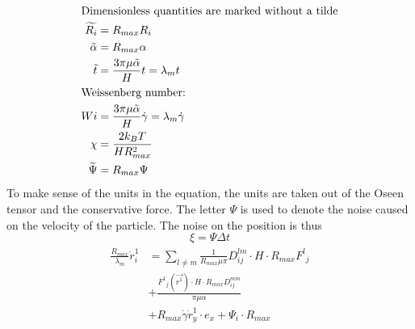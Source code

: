 \documentclass{article}
\begin{document}
\begin{align}
    \intertext{Dimensionless quantities are marked without a tilde}
    \widetilde{R_i} &= R_{max}{R_i}\\
    \tilde{\alpha }&= R_{max} {\alpha}\\
    \tilde{t} &= \frac{3\pi \mu \tilde{\alpha}}{H}{t} = \lambda_m {t} \\
    \intertext{Weissenberg number:}
    Wi &= \frac{3\pi \mu \tilde{\alpha}}{H}\dot{\gamma} =  \lambda_m \dot{\gamma}\\
    \chi &= \frac{2k_B T}{H R^2_{max}} \\
    \widetilde{\Psi} &= R_{max}{\Psi} 
\end{align}
To make sense of the units in the equation, the units are taken out of the Oseen tensor and the conservative force. The letter $\Psi$ is used to denote the noise caused on the velocity of the particle. The noise on the position is thus $$ \xi = \Psi \Delta t$$
\begin{align}
\begin{split}
    \frac{R_{max}}{\lambda_m}{\dot{r}}_{i}^{1} &= \sum_{l \neq m}  \frac{1}{R_{max} \mu \pi} {D_{ij}^{lm}} \cdot H\cdot R_{max} { F^{l}}_{j}   \\& +  \frac{{F^{1}}_{j} (\vec{r^{1}}) \cdot H \cdot R_{max} D_{ij}^{mm}}{ \pi \mu \alpha} \\& + R_{max}\dot{\gamma} {\dot{r}_{y}^{1}}\cdot e_{x}+{\Psi_{i}} \cdot R_{max}
\end{split} 
\end{align}
\end{document}
